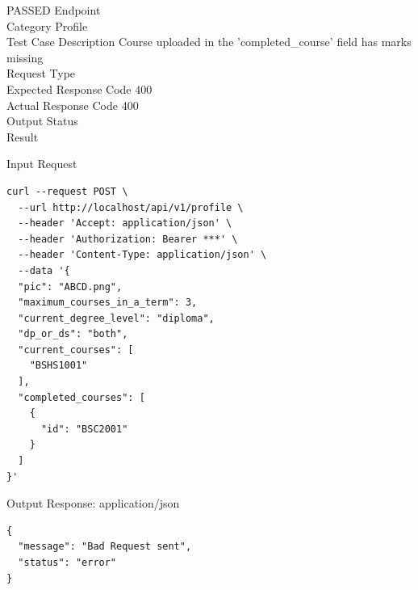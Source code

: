 \begin{testcase}{17}{PASSED}
Endpoint \hfill {}\\
Category \hfill Profile\\
Test Case Description \hfill Course uploaded in the 'completed\_course' field has marks missing\\

Request Type    \hfill {}\\
Expected Response Code    \hfill 400\\
Actual Response Code    \hfill 400\\

Output Status \hfill {}\\
Result \hfill {}

\begin{ipblock}{Input Request}
\begin{verbatim}
curl --request POST \
  --url http://localhost/api/v1/profile \
  --header 'Accept: application/json' \
  --header 'Authorization: Bearer ***' \
  --header 'Content-Type: application/json' \
  --data '{
  "pic": "ABCD.png",
  "maximum_courses_in_a_term": 3,
  "current_degree_level": "diploma",
  "dp_or_ds": "both",
  "current_courses": [
    "BSHS1001"
  ],
  "completed_courses": [
    {
      "id": "BSC2001"
    }
  ]
}'
\end{verbatim}
\end{ipblock}

\begin{opblock}{Output Response: application/json}
\begin{verbatim}
{
  "message": "Bad Request sent",
  "status": "error"
}
\end{verbatim}
\end{opblock}
\end{testcase}

